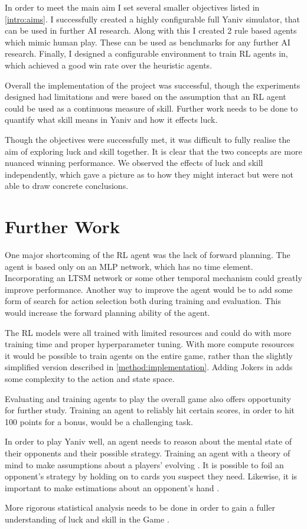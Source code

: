 \documentclass[../main.tex]{subfiles}
\begin{document}
In order to meet the main aim I set several smaller objectives listed in \cref{intro:aims}. I successfully created a highly configurable full Yaniv simulator, that can be used in further AI research. Along with this I created 2 rule based agents which mimic human play. These can be used as benchmarks for any further AI research. Finally, I designed a configurable environment to train RL agents in, which achieved a good win rate over the heuristic agents. 

Overall the implementation of the project was successful, though the experiments designed had limitations and were based on the assumption that an RL agent could be used as a continuous measure of skill. Further work needs to be done to quantify what skill means in Yaniv and how it effects luck. 

Though the objectives were successfully met, it was difficult to fully realise the aim of exploring luck and skill together. It is clear that the two concepts are more nuanced winning performance. We observed the effects of luck and skill independently, which gave a picture as to how they might interact but were not able to draw concrete conclusions. 

\section{Further Work}
One major shortcoming of the RL agent was the lack of forward planning. The agent is based only on an MLP network, which has no time element. Incorporating an LTSM network or some other temporal mechanism could greatly improve performance. Another way to improve the agent would be to add some form of search for action selection both during training and evaluation. This would increase the forward planning ability of the agent. 

The RL models were all trained with limited resources and could do with more training time and proper hyperparameter tuning. With more compute resources it would be possible to train agents on the entire game, rather than the slightly simplified version described in \cref{method:implementation}. Adding Jokers in adds some complexity to the action and state space. 

Evaluating and training agents to play the overall game also offers opportunity for further study. Training an agent to reliably hit certain scores, in order to hit 100 points for a bonus, would be a challenging task. 

In order to play Yaniv well, an agent needs to reason about the mental state of their opponents and their possible strategy. Training an agent with a theory of mind to make assumptions about a players' evolving \cite{fuchs_theory_2021}. It is possible to foil an opponent's strategy by holding on to cards you suspect they need. Likewise, it is important to make estimations about an opponent's hand \cite{mishra_opponent_nodate}.

More rigorous statistical analysis needs to be done in order to gain a fuller understanding of luck and skill in the Game \cite{guo_distinguishing_2019}. 
\end{document}
